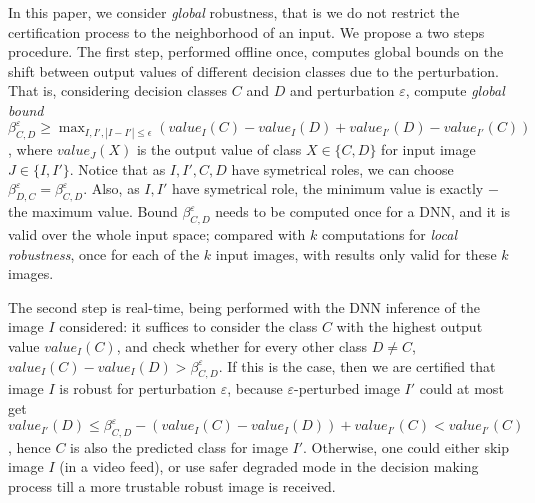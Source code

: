 In this paper, we consider {\em global} robustness, that is we do not restrict the certification process to the neighborhood of an input. We propose a two steps procedure. The first step, performed offline once, 
computes global bounds on the shift between 
output values of different decision classes due to the perturbation. That is, considering decision classes $C$ and $D$ and perturbation $\varepsilon$, compute 
{\em global bound} $\beta^\varepsilon_{C,D} \geq \max_{I,I', |I-I'| \leq \epsilon}(value_{I}(C) - value_{I}(D) + value_{I'}(D) - value_{I'}(C))$, where $value_{J}(X)$ is the output value of class $X \in \{C,D\}$ for input image $J \in \{I,I'\}$. Notice that as 
$I,I',C,D$ have symetrical roles, we can choose $\beta^\varepsilon_{D,C} = \beta^\varepsilon_{C,D}$. Also, as $I,I'$ have symetrical role, the minimum value is exactly $-$ the maximum value. 
Bound $\beta^\varepsilon_{C,D}$ needs to be computed once for a DNN, 
and it is valid over the whole input space; compared with $k$ computations for {\em local robustness}, once for each of the $k$ input images, with results only valid for these $k$ images.

The second step is real-time, being performed with the DNN inference of the image $I$ considered: it suffices to consider the class $C$ with the highest output value $value_{I}(C)$, and check whether for every other class $D \neq C$, 
$value_{I}(C) - value_{I}(D) > \beta^\varepsilon_{C,D}$. 
If this is the case, then we are certified that image $I$ is robust for perturbation $\varepsilon$, because $\varepsilon$-perturbed image $I'$ could at most get  $value_{I'}(D) \leq \beta^\varepsilon_{C,D}  - (value_{I}(C) - value_{I}(D))  + value_{I'}(C) < value_{I'}(C)$, hence $C$ is also the predicted class for image $I'$. Otherwise, one could either skip image $I$ (in a video feed), or use safer degraded mode in the decision making process till a more trustable robust image is received.


